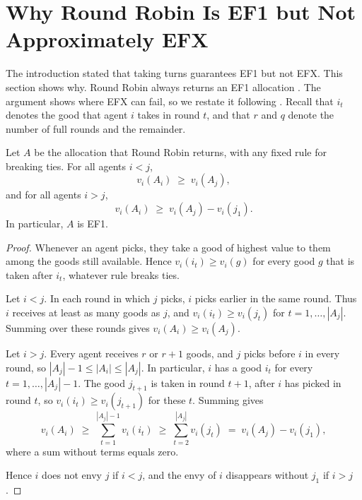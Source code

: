 \section{Why Round Robin Is EF1 but Not Approximately EFX}\label{sec:rrEF1}

The introduction stated that taking turns guarantees EF1 but not EFX. This section shows why.
Round Robin always returns an EF1 allocation \parencite[p.~12:7]{caragiannis2019}. The argument shows where EFX can fail, so we restate it following
\textcite[Thm.~1]{amanatidis2023survey}. Recall that $i_t$ denotes the good that agent $i$ takes in
round $t$, and that $r$ and $q$ denote the number of full rounds and the remainder.

\begin{proposition}\label{prop:rrEF1}
Let $A$ be the allocation that Round Robin returns, with any fixed rule for breaking ties. For all
agents $i<j$,
\[
  v_i(A_i)\;\geq\; v_i(A_j),
\]
and for all agents $i>j$,
\[
  v_i(A_i)\;\geq\; v_i(A_j)-v_i(j_1).
\]
In particular, $A$ is EF1.
\end{proposition}

\begin{proof}
Whenever an agent picks, they take a good of highest value to them among the goods still
available. Hence $v_i(i_t)\geq v_i(g)$ for every good $g$ that is taken after $i_t$, whatever rule
breaks ties.

Let $i<j$. In each round in which $j$ picks, $i$ picks earlier in the same round. Thus $i$ receives
at least as many goods as $j$, and $v_i(i_t)\geq v_i(j_t)$ for $t=1,\dots,|A_j|$. Summing over these
rounds gives $v_i(A_i)\geq v_i(A_j)$.

Let $i>j$. Every agent receives $r$ or $r+1$ goods, and $j$ picks before $i$ in every round, so
$|A_j|-1\leq|A_i|\leq|A_j|$. In particular, $i$ has a good $i_t$ for every $t=1,\dots,|A_j|-1$. The
good $j_{t+1}$ is taken in round $t+1$, after $i$ has picked in round $t$, so
$v_i(i_t)\geq v_i(j_{t+1})$ for these $t$. Summing gives
\[
  v_i(A_i)\;\geq\;\sum_{t=1}^{|A_j|-1}v_i(i_t)\;\geq\;\sum_{t=2}^{|A_j|}v_i(j_t)
  \;=\;v_i(A_j)-v_i(j_1),
\]
where a sum without terms equals zero.

Hence $i$ does not envy $j$ if $i<j$, and the envy of $i$ disappears without $j_1$ if $i>j$.
\end{proof}

